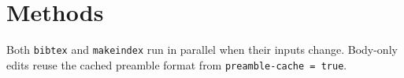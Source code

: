 \section{Methods}\label{sec:methods}

Both \texttt{bibtex} and \texttt{makeindex} run
in parallel when their inputs change. Body-only edits reuse the cached preamble
format from \texttt{preamble-cache = true}.
